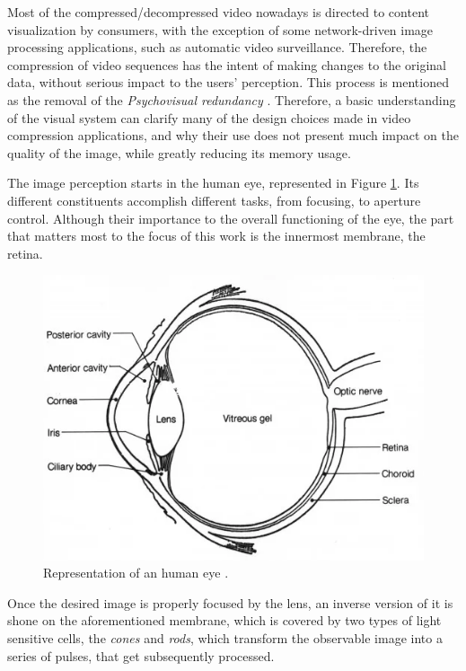 \nocite{gonzalezDigitalImageProcessing2018}

Most of the compressed/decompressed video nowadays is directed to content visualization by consumers, with the exception of some network-driven image processing applications, such as automatic video surveillance. Therefore, the compression of video sequences has the intent of making changes to the original data, without serious impact to the users' perception. This process is mentioned as the removal of the \emph{Psychovisual redundancy} \cite{shiImageVideoCompression2008}. Therefore, a basic understanding of the visual system can clarify many of the design choices made in video compression applications, and why their use does not present much impact on the quality of the image, while greatly reducing its memory usage.

The image perception starts in the human eye, represented in Figure \ref{fig:eye}. Its different constituents accomplish different tasks, from focusing, to aperture control. Although their importance to the overall functioning of the eye, the part that matters most to the focus of this work is the innermost membrane, the retina.

\begin{figure}[h]
    \centering
    \includegraphics[width=\figwidth]{Sections/2AV1/Diagrams/eyediagram.png}
    \caption[Representation of an human eye]{Representation of an human eye \cite{owlcationAnatomyEyeHuman}.}
    \label{fig:eye}
\end{figure}

Once the desired image is properly focused by the lens, an inverse version of it is shone on the aforementioned membrane, which is covered by two types of light sensitive cells, the \emph{cones} and \emph{rods}, which transform the observable image into a series of pulses, that get subsequently processed.

